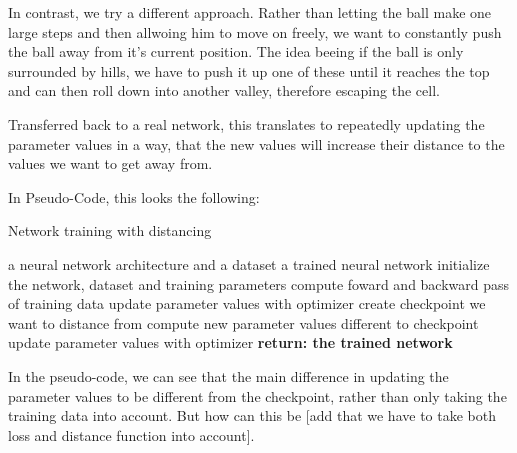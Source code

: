 In contrast, we try a different approach. Rather than letting the ball make one
large steps and then allwoing him to move on freely, we want to constantly push
the ball away from it's current position. The idea beeing if the ball is only
surrounded by hills, we have to push it up one of these until it reaches the top
and can then roll down into another valley, therefore escaping the cell.

Transferred back to a real network, this translates to repeatedly updating the
parameter values in a way, that the new values will increase their distance to
the values we want to get away from.

In Pseudo-Code, this looks the following:
\begin{algorithm}
    \begin{algorithmic}[1]
        \caption{Network training with distancing}
        \REQUIRE a neural network architecture and a dataset
        \ENSURE a trained neural network
        \STATE initialize the network, dataset and training parameters
            \STATE compute foward and backward pass of training data
            \STATE update parameter values with optimizer
        \ENDFOR
        \STATE create checkpoint we want to distance from
            \STATE compute new parameter values different to checkpoint
            \STATE update parameter values with optimizer
        \ENDFOR
        \STATE \textbf{return: the trained network}
    \end{algorithmic}
\end{algorithm}

In the pseudo-code, we can see that the main difference in updating the
parameter values to be different from the checkpoint, rather than only taking
the training data into account. But how can this be [add that we have to take
both loss and distance function into account].




